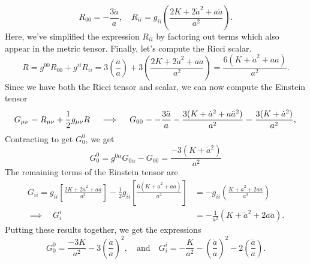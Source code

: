 \documentclass{lkx_pset}
\begin{document}
\begin{solution}
	\begin{equation}
		R_{00} =  -\frac{3\ddot{a}}{a}, \quad
		R_{ii} = g_{ii}\left(\frac{2K + 2\dot{a}^2 + a\ddot{a}}{a^2}\right).
	\end{equation}
	Here, we've simplified the expression $R_{ii}$ by factoring out terms which also appear in the metric tensor. Finally, let's compute the Ricci scalar.
	\[
		R = g^{00} R_{00} + g^{ii}R_{ii}=
		3\left(\frac{\ddot{a}}{a}\right) + 3\left(\frac{2K+2\dot{a}^2 + a\ddot{a}}{a^2}\right) = \frac{6(K+\dot{a}^2+a\ddot{a})}{a^2}.
	\]
	Since we have both the Ricci tensor and scalar, we can now compute the Einstein tensor
	\[
		G_{\mu\nu} = R_{\mu\nu}+\frac{1}{2}g_{\mu\nu} R
		\quad\implies\quad
		G_{00} = -\frac{3\ddot{a}}{a}-\frac{3(K+\dot{a}^2+a\ddot{a}^2)}{a^2} = \frac{3(K+\dot{a}^2)}{a^2},\\
	\]
	Contracting to get $G^0_0$, we get
	\[
	  G_0^0 = g^{0\alpha}G_{0\alpha} -G_{00}= \frac{-3(K+\dot{a}^2)}{a^2}
	\]
	The remaining terms of the Einstein tensor are
	\[
		\begin{aligned}
			G_{ii} = g_{ii}\left[\frac{2K + 2\dot{a}^2 + a\ddot{a}}{a^2}\right] - \frac{1}{2}g_{ii}\left[\frac{6(K+\dot{a}^2 + a\ddot{a})}{a^2}\right] &= -g_{ii}\left(\frac{K+\dot{a}^2 + 2a\ddot{a}}{a^2}\right)\\
			\implies\quad G_i^i &= -\frac{1}{a^2}(K + \dot{a}^2 + 2a\ddot{a}).
		\end{aligned}
	\]
	Putting these results together, we get the expressions
	\[
    \boxed{G_0^0 = \frac{-3K}{a^2} -3\left(\frac{\dot{a}}{a}\right)^2,}\quad\textrm{and}\quad \boxed{G_i^i = -\frac{K}{a^2} - \left(\frac{\dot{a}}{a}\right)^2 - 2\left(\frac{\ddot{a}}{a}\right).}
	\]
\end{solution}
\end{document}
